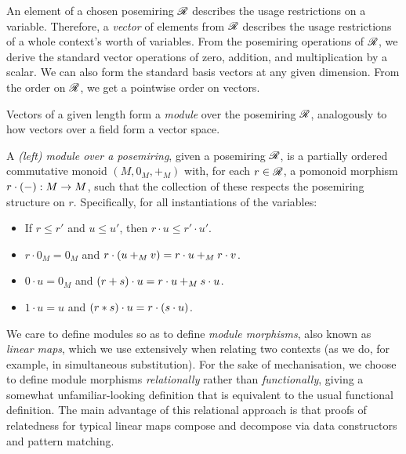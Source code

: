 An element of a chosen posemiring $\mathscr R$ describes the usage restrictions on
a variable.
Therefore, a \emph{vector} of elements from $\mathscr R$ describes the usage
restrictions of a whole context's worth of variables.
From the posemiring operations of $\mathscr R$, we derive the standard vector
operations of zero, addition, and multiplication by a scalar.
We can also form the standard basis vectors at any given dimension.
From the order on $\mathscr R$, we get a pointwise order on vectors.

Vectors of a given length form a \emph{module} over the posemiring $\mathscr R$,
analogously to how vectors over a field form a vector space.

\begin{definition}
  A \emph{(left) module over a posemiring}, given a posemiring $\mathscr R$, is a
  partially ordered commutative monoid $(M, 0_M, +_M)$ with, for each
  $r \in \mathscr R$, a pomonoid morphism $r \cdot \plr{-} : M \to M$, such that the
  collection of these respects the posemiring structure on $r$.
  Specifically, for all instantiations of the variables:
  \begin{itemize}
      \item If $r \leq r'$ and $u \leq u'$, then $r \cdot u \leq r' \cdot u'$.
    \item $r \cdot 0_M = 0_M$ and
      $r \cdot \plr{u +_M v} = r \cdot u +_M r \cdot v$.
    \item $0 \cdot u = 0_M$ and
      $\plr{r + s} \cdot u = r \cdot u +_M s \cdot u$.
    \item $1 \cdot u = u$ and
      $\plr{r * s} \cdot u = r \cdot \plr{s \cdot u}$.
  \end{itemize}
\end{definition}

We care to define modules so as to define \emph{module morphisms}, also known
as \emph{linear maps}, which we use extensively when relating two contexts (as
we do, for example, in simultaneous substitution).
For the sake of mechanisation, we choose to define module morphisms
\emph{relationally} rather than \emph{functionally}, giving a somewhat
unfamiliar-looking definition that is equivalent to the usual functional
definition.
The main advantage of this relational approach is that proofs of relatedness
for typical linear maps compose and decompose via data constructors and
pattern matching.

